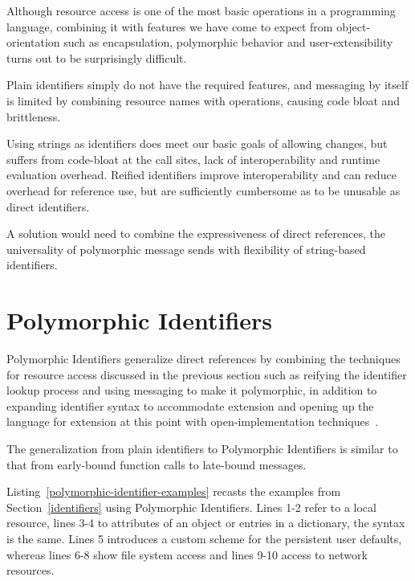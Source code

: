 \documentclass[preprint,authoryear]{llncs}
\begin{document}
Although resource access is one of the most basic operations in a programming language, combining it
with features we have come to expect from object-orientation such as encapsulation, polymorphic
behavior and user-extensibility turns out to be surprisingly difficult.  

Plain identifiers simply do not have the required features, and messaging by itself is limited
by combining resource names with operations, causing code bloat and brittleness.

Using strings as identifiers does meet our basic goals of allowing changes, but suffers from
code-bloat at the call sites, lack of interoperability and runtime evaluation overhead.  Reified 
identifiers improve interoperability and can reduce overhead for reference use, but are 
sufficiently cumbersome as to be unusable as direct identifiers.

A solution would need to combine the expressiveness of direct references, the universality
of polymorphic message sends with flexibility of string-based identifiers.



\section{Polymorphic Identifiers}
\label{polymorphic-identifiers}

Polymorphic Identifiers generalize direct references by combining the techniques for resource access
discussed in the previous section such as reifying the identifier lookup process and using messaging 
to make it polymorphic, in addition to expanding identifier syntax to accommodate extension and 
opening up the language for extension at this point  with open-implementation techniques~\cite{OpenImplementations}.

The generalization from plain identifiers to Polymorphic Identifiers is similar to that from early-bound
function calls to late-bound messages.

Listing~\ref{polymorphic-identifier-examples} recasts the examples from Section~\ref{identifiers} using
Polymorphic Identifiers.  Lines 1-2 refer to a local resource, lines 3-4 to attributes of an object or 
entries in a dictionary, the syntax is the same.  Lines 5 introduces a custom scheme for the persistent
user defaults, whereas lines 6-8 show file system access and lines 9-10 access to network resources.
\end{document}
